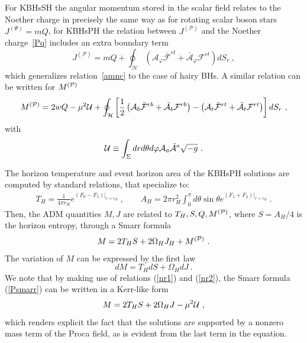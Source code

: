 For KBHsSH the angular momentum stored in the scalar field relates to the Noether charge in precisely the same way as for rotating scalar boson stars $J^{(\Psi)}=mQ$, for KBHsPH the relation between $J^{(\mathcal{P})} $ and  the Noether charge~\eqref{Pq} includes an extra boundary term
\begin{equation}
\label{nr1}
J^{(\mathcal{P})}=mQ+ \oint_\mathcal{H}  ({\mathcal{A}}_\varphi \bar{ {\mathcal{F}}}^{r t}+\bar{\mathcal{A}}_\varphi { {\mathcal{F}}}^{r t}  ) dS_r \ ,
\end{equation}
which generalizes relation~\eqref{amnc} to the case of hairy BHs. 
A similar relation can be written for $M^{({\cal P})}$
\begin{equation}
\label{nr2}
M^{({\cal P})}=2w Q
-\mu^2  {\cal U}
+ \oint_\mathcal{H}  
\left[
\frac{1}{2} 
\left(
{\mathcal{A}}_b \bar{ {\mathcal{F}}}^{r b}+\bar{\mathcal{A}}_b { {\mathcal{F}}}^{r b}
\right)
-\left({\mathcal{A}}_t \bar{ {\mathcal{F}}}^{r t}+\bar{\mathcal{A}}_t { {\mathcal{F}}}^{r t}
\right)  
\right] dS_r \ ,
\end{equation}
with
\begin{equation}
\label{ProcaU}
{\cal U}\equiv \int _\Sigma  dr d\theta d\varphi  {\mathcal{A}}_a \bar {\mathcal{A}}^a \sqrt{-g}\ .
\end{equation}


The horizon temperature and event horizon area of the KBHsPH solutions are computed by standard relations, that specialize to: 
\begin{eqnarray}
\label{PTHAH}
T_H=\frac{1}{4\pi r_H}e^{(F_0-F_1)|_{r=r_H}} \ , \qquad
 A_H=2\pi r_H^2 \int_0^\pi d\theta \sin \theta  e^{(F_1+F_2)|_{r=r_H}}\ . 
 \end{eqnarray}
Then, the ADM quantities $M,J$ are related to $T_H,S,Q,M^{({\cal P})}$, where $S=A_H/4$ is the horizon entropy, through a Smarr formula  
%
\begin{eqnarray}
\label{Psmarr} 
M=2 T_H S +2\Omega_H J_H+ M^{({\cal P})} \ .
\end{eqnarray}
The variation of $M$ can be expressed by the first law
\begin{equation}
\label{fl}
dM=T_H dS +\Omega_H dJ \ .
\end{equation}
We note that
by making use of relations
(\ref{nr1})
and
(\ref{nr2}),
 the Smarr formula (\ref{Psmarr})
can be written in a Kerr-like form
\begin{eqnarray}
\label{smarr-new1} 
M=2 T_H S +2\Omega_H J-\mu^2 {\cal U} \ ,
\end{eqnarray}
which renders explicit the fact that the solutions are supported by
a nonzero mass term of the Proca field, as is evident from the last term in the equation.

